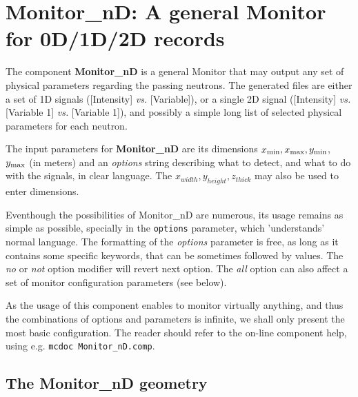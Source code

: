 \section{Monitor\_nD: A general Monitor for 0D/1D/2D records}
\label{s:monitornd}


The component {\bf Monitor\_nD} is a general Monitor that may output any
set of physical parameters regarding the passing neutrons. The
generated files are either a set of 1D signals ([Intensity] {\it vs.}
[Variable]), or a single 2D signal ([Intensity] {\it vs.} [Variable 1]
{\it vs.} [Variable 1]), and possibly a simple long list of selected
physical parameters for each neutron.

The input parameters for {\bf Monitor\_nD} are its dimensions $x_{\rm
  min}, x_{\rm max}, y_{\rm min}$, $y_{\rm max}$ (in meters) and an {\it
  options} string describing what to detect, and what to do with the
signals, in clear language. The $x_{width}, y_{height}, z_{thick}$ may also be used to enter dimensions.

Eventhough the possibilities of Monitor\_nD are numerous, its usage remains as simple as possible, specially in the \verb+options+ parameter, which 'understands' normal language.
The formatting of the {\it options}
parameter is free, as long as it contains some specific keywords, that
can be sometimes followed by values. The {\it no} or {\it not} option
modifier will revert next option. The {\it all} option can also affect a
set of monitor configuration parameters (see below).

As the usage of this component enables to monitor virtually anything, and thus the combinations of options and parameters is infinite, we shall only present the most basic configuration. The reader should refer to the on-line component help, using e.g. \verb+mcdoc Monitor_nD.comp+.

\subsection{The Monitor\_nD geometry}

